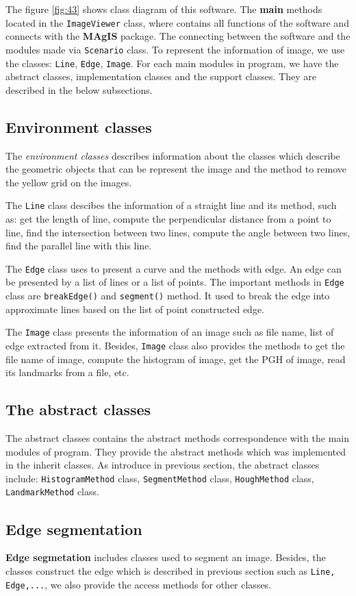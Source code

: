 The figure \ref{fig:43} shows class diagram of this software. The \textbf{main} methods located in the \texttt{ImageViewer} class, where contains all functions of the software and connects with the \textbf{MAgIS} package. The connecting between the software and the modules made via \texttt{Scenario} class. To represent the information of image, we use the classes: \texttt{Line}, \texttt{Edge}, \texttt{Image}. For each main modules in program, we have the abstract classes, implementation classes and the support classes. They are described in the below subsections.
\subsection*{Environment classes}
The \textit{environment classes} describes information about the classes which describe the geometric objects that can be represent the image and the method to remove the yellow grid on the images.

The \texttt{Line} class descibes the information of a straight line and its method, such as: get the length of line, compute the perpendicular distance from a point to line, find the intersection between two lines, compute the angle between two lines, find the parallel line with this line.

The \texttt{Edge} class uses to present a curve and the methods with edge. An edge can be presented by a list of lines or a list of points. The important methods in \texttt{Edge} class are \texttt{breakEdge()} and \texttt{segment()} method. It used to break the edge into approximate lines based on the list of point constructed edge.

The \texttt{Image} class presents the information of an image such as file name, list of edge extracted from it. Besides, \texttt{Image} class also provides the methods to get the file name of image, compute the histogram of image, get the PGH of image, read its landmarks from a file, etc.
\subsection*{The abstract classes}
The abstract classes contains the abstract methods correspondence with the main modules of program. They provide the abstract methods which was implemented in the inherit classes. As introduce in previous section, the abstract classes include: \texttt{HistogramMethod} class, \texttt{SegmentMethod} class, \texttt{HoughMethod} class, \texttt{LandmarkMethod} class.
\subsection{Edge segmentation }
\textbf{Edge segmetation} includes classes used to segment an image. Besides, the classes construct the edge which is described in previous section such as \texttt{Line, Edge,...}, we also provide the access methods for other classes.

